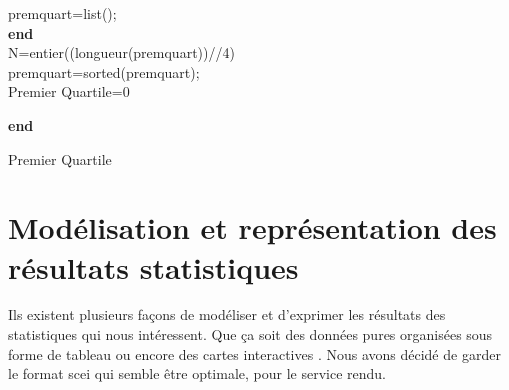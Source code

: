          \begin{algorithm}[H]
          premquart=list();\\
         \textbf{end}\\  
         N=entier((longueur(premquart))//4)\\
         premquart=sorted(premquart);\\
         Premier Quartile=0\\
         
         \textbf{end}
         
         \caption{Premier Quartile}
         
        \end{algorithm}
\section{Modélisation et représentation des résultats statistiques}
Ils existent plusieurs façons de modéliser et d'exprimer les résultats des statistiques qui nous intéressent. Que ça soit des données pures organisées sous forme de tableau ou encore des cartes interactives . Nous avons décidé de garder le format scei qui semble être optimale, pour le service rendu.